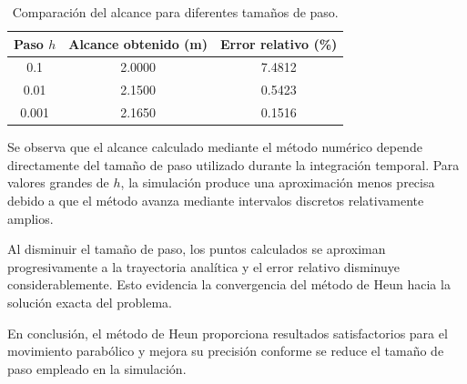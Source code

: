\begin{table}[H]
\centering
\begin{tabular}{ccc}
\hline
Paso $h$ & Alcance obtenido (m) & Error relativo (\%) \\
\hline
0.1   & 2.0000 & 7.4812 \\
0.01  & 2.1500 & 0.5423 \\
0.001 & 2.1650 & 0.1516 \\
\hline
\end{tabular}
\caption{Comparación del alcance para diferentes tamaños de paso.}
\label{tab:comparacion}
\end{table}

Se observa que el alcance calculado mediante el método numérico depende directamente del tamaño de paso utilizado durante la integración temporal. Para valores grandes de $h$, la simulación produce una aproximación menos precisa debido a que el método avanza mediante intervalos discretos relativamente amplios.

Al disminuir el tamaño de paso, los puntos calculados se aproximan progresivamente a la trayectoria analítica y el error relativo disminuye considerablemente. Esto evidencia la convergencia del método de Heun hacia la solución exacta del problema.

En conclusión, el método de Heun proporciona resultados satisfactorios para el movimiento parabólico y mejora su precisión conforme se reduce el tamaño de paso empleado en la simulación.
